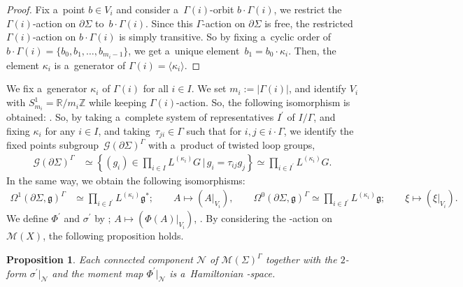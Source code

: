 \documentclass[10pt,a4paper]{amsart}
\numberwithin{equation}{section}
\newtheorem{Proposition}[Theorem]{Proposition}
\theoremstyle{definition}
\newcommand{\bR}{\mathbb{R}}
\newcommand{\bZ}{\mathbb{Z}}
\begin{document}
\begin{proof}
 Fix a~point $b \in V_i$ and consider a~$\Gamma(i)$-orbit $b \cdot \Gamma(i)$, we restrict the $\Gamma(i)$-action on $\partial \Sigma$ to~$b \cdot \Gamma(i)$.
 Since this $\Gamma$-action on $\partial \Sigma$ is free, the restricted $\Gamma(i) $-action on $b \cdot \Gamma(i)$ is simply transitive.
 So by fixing a~cyclic order of $b \cdot \Gamma(i) =\{b_0, b_1, \dots, b_{m_i-1}\}$, we get a~unique element~$b_1 = b_0 \cdot \kappa_i$.
 Then, the element $\kappa_i$ is a~generator of $\Gamma(i) = \langle \kappa_i \rangle$.
\end{proof}

We fix a~generator $\kappa_i$ of $\Gamma(i)$ for all $i \in I$.
We set $m_i := | \Gamma(i)|$, and identify $V_i$ with $S^{1}_{m_i} = \bR / m_i \bZ$ while keeping $\Gamma(i)$-action.
So, the following isomorphism is obtained:
.
So, by taking a~complete system of representatives $I^{\prime}$ of $I/\Gamma$, and fixing $\kappa_i$ for any $i \in I$,
and taking~${\tau_{ji} \in \Gamma }$ such that  for $i, j \in i\cdot \Gamma$,
we identify the fixed points subgroup~$\mathcal{G}(\partial \Sigma)^{\Gamma}$ with a~product of twisted loop groups,
\begin{align*}
 \mathcal{G}(\partial \Sigma)^{\Gamma} &\simeq \left\{(g_i) \in \underset{i \in I}{\prod} L^{(\kappa_i)}G\,\bigg|\, g_i = \tau_{ij} g_j\right\} \simeq \underset{i \in I^{\prime}}{\prod} L^{(\kappa_i)}G.
\end{align*}
In the same way, we obtain the following isomorphisms:
\begin{align*}
 \Omega^{1}(\partial \Sigma, \mathfrak{g})^{\Gamma} &\simeq \underset{i \in I^{\prime}}{\prod} L^{(\kappa_i)}\mathfrak{g}^{*};\qquad A \mapsto (A|_{V_i}), \qquad
 \Omega^{0}(\partial \Sigma, \mathfrak{g})^{\Gamma} \simeq \underset{i \in I^{\prime}}{\prod} L^{(\kappa_i)}\mathfrak{g};\qquad \xi \mapsto (\xi|_{V_i}).
\end{align*}
We define $\Phi^{\prime}$ and $\sigma^{\prime}$ by
; $ A \mapsto (\Phi(A)|_{V_i})$, .
By considering the -action on $\mathcal{M}(X)$, the following proposition holds.

\begin{Proposition}
 Each connected component $\mathcal{N}$ of $\mathcal{M}(\Sigma)^{\Gamma}$ together with the $2$-form $\sigma^{\prime}|_{\mathcal{N}}$ and the moment map $\Phi^{\prime}|_{\mathcal{N}}$ is a~Hamiltonian -space.
\end{Proposition}
\end{document}
